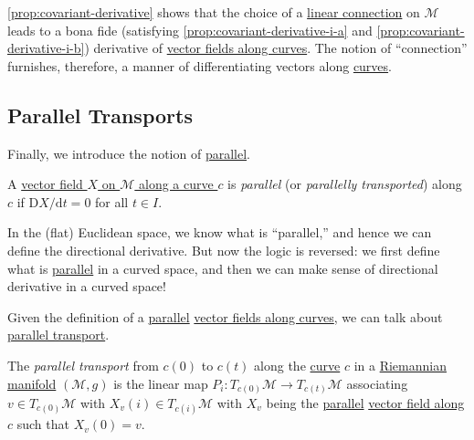 \begin{remark}
	\autoref{prop:covariant-derivative} shows that the choice of a \hyperref[def:linear-connection]{linear connection} on \(\mathcal{M} \) leads to a bona fide (satisfying \autoref{prop:covariant-derivative-i-a} and \autoref{prop:covariant-derivative-i-b}) derivative of \hyperref[def:vector-field-along-curve]{vector fields along curves}. The notion of ``connection'' furnishes, therefore, a manner of differentiating vectors along \hyperref[def:curve]{curves}.
\end{remark}

\subsection{Parallel Transports}
Finally, we introduce the notion of \hyperref[def:parallel]{parallel}.

\begin{definition}[Parallel]\label{def:parallel}
	A \hyperref[def:vector-field-along-curve]{vector field \(X\) on \(\mathcal{M} \) along a curve \(c\)} is \emph{parallel} (or \emph{parallelly transported}) along \(c\) if \(\mathrm{D} X/ \mathrm{d} t = 0\) for all \(t\in I\).
\end{definition}

\begin{intuition}
	In the (flat) Euclidean space, we know what is ``parallel,'' and hence we can define the directional derivative. But now the logic is reversed: we first define what is \hyperref[def:parallel]{parallel} in a curved space, and then we can make sense of directional derivative in a curved space!
	\begin{center}
	\end{center}
\end{intuition}

Given the definition of a \hyperref[def:parallel]{parallel} \hyperref[def:vector-field-along-curve]{vector fields along curves}, we can talk about \hyperref[def:parallel-transport]{parallel transport}.

\begin{definition}\label{def:parallel-transport}
	The \emph{parallel transport} from \(c(0)\) to \(c(t)\) along the \hyperref[def:curve]{curve} \(c\) in a \hyperref[def:Riemannian-manifold]{Riemannian manifold} \((\mathcal{M} , g)\) is the linear map \(P_i \colon T_{c(0)} \mathcal{M} \to T_{c(t) }\mathcal{M} \) associating \(v\in T_{c(0)} \mathcal{M} \) with \(X_v(i)\in T_{c(i)}\mathcal{M} \) with \(X_v\) being the \hyperref[def:parallel]{parallel} \hyperref[def:vector-field-along-curve]{vector field along \(c\)} such that \(X_v (0) = v\).
\end{definition}

